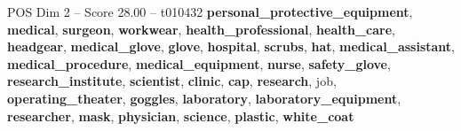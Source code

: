 \begin{textsample}{POS Dim 2 – Score 28.00 – t010432}  \label{ex:f2_pos_036}
\textbf{personal\_protective\_equipment}, \textbf{medical}, \textbf{surgeon}, \textbf{workwear}, \textbf{health\_professional}, \textbf{health\_care}, \textbf{headgear}, \textbf{medical\_glove}, \textbf{glove}, \textbf{hospital}, \textbf{scrubs}, \textbf{hat}, \textbf{medical\_assistant}, \textbf{medical\_procedure}, \textbf{medical\_equipment}, \textbf{nurse}, \textbf{safety\_glove}, \textbf{research\_institute}, \textbf{scientist}, \textbf{clinic}, \textbf{cap}, \textbf{research}, job, \textbf{operating\_theater}, \textbf{goggles}, \textbf{laboratory}, \textbf{laboratory\_equipment}, \textbf{researcher}, \textbf{mask}, \textbf{physician}, \textbf{science}, \textbf{plastic}, \textbf{white\_coat}

\end{textsample}
